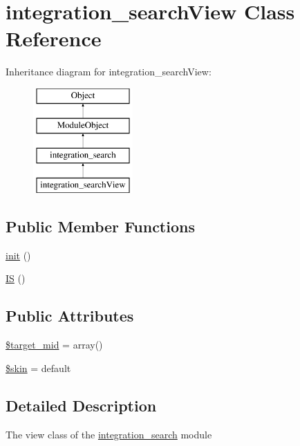 \hypertarget{classintegration__searchView}{}\section{integration\+\_\+search\+View Class Reference}
\label{classintegration__searchView}
Inheritance diagram for integration\+\_\+search\+View\+:\begin{figure}[H]
\begin{center}
\leavevmode
\includegraphics[height=4.000000cm]{classintegration__searchView}
\end{center}
\end{figure}
\subsection*{Public Member Functions}
\begin{DoxyCompactItemize}
\item 
\hyperlink{classintegration__searchView_aeed621ea43574fc7b4c5d650d1d698b6}{init} ()
\item 
\hyperlink{classintegration__searchView_a271296176ae955cb88c55c5eac511a23}{IS} ()
\end{DoxyCompactItemize}
\subsection*{Public Attributes}
\begin{DoxyCompactItemize}
\item 
\hyperlink{classintegration__searchView_a17efafd7259acddb90e2c181bcfeaa38}{\$target\+\_\+mid} = array()
\item 
\hyperlink{classintegration__searchView_a4281fc0752039ec4025ddaca5771f074}{\$skin} = \textquotesingle{}default\textquotesingle{}
\end{DoxyCompactItemize}


\subsection{Detailed Description}
The view class of the \hyperlink{classintegration__search}{integration\+\_\+search} module

